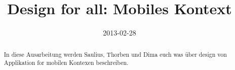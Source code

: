 \documentclass[]{article}
\title{Design for all: Mobiles Kontext}
\author{  }
\date{2013-02-28}
\begin{document}
\ifpdf
{}
\else
{}
\fi

\maketitle


\begin{abstract}
	In diese Ausarbeitung werden Saulius, Thorben und Dima euch was über design von Applikation for mobilen Kontexen beschreiben.
\end{abstract}







\end{document}
